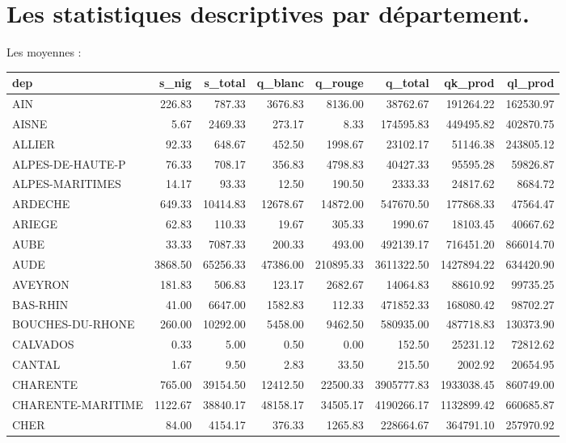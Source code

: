 \documentclass[11pt, a4paper]{article}
\begin{document}
\section*{Les statistiques descriptives par département.}
\par
Les moyennes :
\FloatBarrier
\hskip-2.0cm\begin{tabular}{lrrrrrrr}
  \hline
  dep & s\_nig & s\_total & q\_blanc & q\_rouge & q\_total & qk\_prod & ql\_prod 
\\ 
  \hline
  AIN & 226.83 & 787.33 & 3676.83 & 8136.00 & 38762.67 & 191264.22 & 162530.97 \\ 
  AISNE & 5.67 & 2469.33 & 273.17 & 8.33 & 174595.83 & 449495.82 & 402870.75 \\
  ALLIER & 92.33 & 648.67 & 452.50 & 1998.67 & 23102.17 & 51146.38 & 243805.12 \\ 
  ALPES-DE-HAUTE-P & 76.33 & 708.17 & 356.83 & 4798.83 & 40427.33 & 95595.28 & 59826.87 \\ 
  ALPES-MARITIMES & 14.17 & 93.33 & 12.50 & 190.50 & 2333.33 & 24817.62 & 8684.72 \\
  ARDECHE & 649.33 & 10414.83 & 12678.67 & 14872.00 & 547670.50 & 177868.33 &  47564.47 \\ 
  ARIEGE & 62.83 & 110.33 & 19.67 & 305.33 & 1990.67 & 18103.45 & 40667.62 \\ 
  AUBE & 33.33 & 7087.33 & 200.33 & 493.00 & 492139.17 & 716451.20 & 866014.70 \\
  AUDE & 3868.50 & 65256.33 & 47386.00 & 210895.33 & 3611322.50 & 1427894.22 & 634420.90 \\ 
  AVEYRON & 181.83 & 506.83 & 123.17 & 2682.67 & 14064.83 & 88610.92 & 99735.25 \\
  BAS-RHIN & 41.00 & 6647.00 & 1582.83 & 112.33 & 471852.33 & 168080.42 & 98702.27 \\
  BOUCHES-DU-RHONE & 260.00 & 10292.00 & 5458.00 & 9462.50 & 580935.00 & 487718.83 & 130373.90 \\ 
  CALVADOS & 0.33 & 5.00 & 0.50 & 0.00 & 152.50 & 25231.12 & 72812.62 \\ 
  CANTAL & 1.67 & 9.50 & 2.83 & 33.50 & 215.50 & 2002.92 & 20654.95 \\ 
  CHARENTE & 765.00 & 39154.50 & 12412.50 & 22500.33 & 3905777.83 & 1933038.45 & 860749.00 \\ 
  CHARENTE-MARITIME & 1122.67 & 38840.17 & 48158.17 & 34505.17 & 4190266.17 & 1132899.42 & 660685.87 \\ 
  CHER & 84.00 & 4154.17 & 376.33 & 1265.83 & 228664.67 & 364791.10 & 257970.92 \\ 

\end{tabular}
\end{document}
